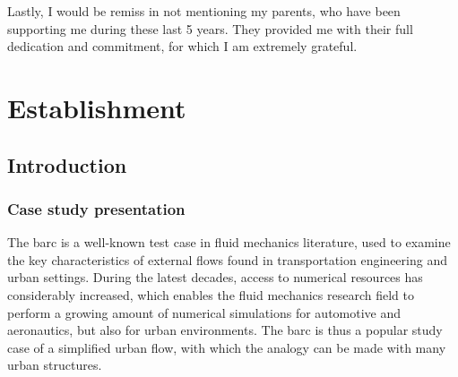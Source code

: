 \documentclass[12pt,twoside]{report}
\newcommand\blankpage{%
    \null
    \thispagestyle{empty}%
    \addtocounter{page}{-1}%
    \newpage}
\begin{document}
Lastly, I would be remiss in not mentioning my parents, who have been supporting me during these last 5 years. They provided me with their full dedication and commitment, for which I am extremely grateful.



\clearpage




\clearpage

\tableofcontents
\thispagestyle{empty}


\thispagestyle{empty}
\begin{center}
	
\end{center}






\clearpage
{}
\setcounter{page}{1}

\part{Establishment}

\clearpage

\chapter{Introduction}

\minitoc

\clearpage 

\section{Case study presentation}
The \gls{barc} is a well-known test case in fluid mechanics literature, used to examine the key characteristics of external flows found in transportation engineering and urban settings. During the latest decades, access to numerical resources has considerably increased, which enables the fluid mechanics research field to perform a growing amount of numerical simulations for automotive and aeronautics, but also for urban environments. The \gls{barc} is thus a popular study case of a simplified urban flow, with which the analogy can be made with many urban structures. 
\end{document}
